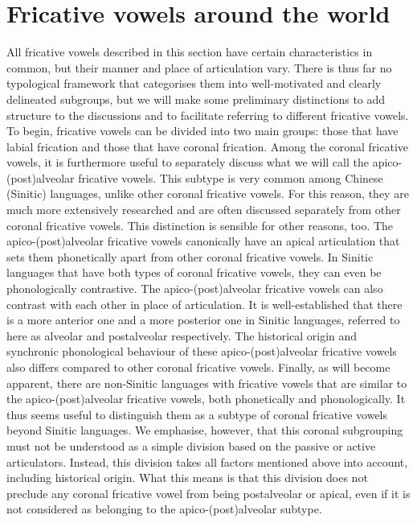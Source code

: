 \documentclass[output=paper,colorlinks,citecolor=brown,chinesefont]{langscibook}
\begin{document}
\section{Fricative vowels around the world} \label{section2}
All fricative vowels described in this section have certain characteristics in common, but their manner and place of articulation vary. There is thus far no typological framework that categorises them into well-motivated and clearly delineated subgroups, but we will make some preliminary distinctions to add structure to the discussions and to facilitate referring to different fricative vowels. To begin, fricative vowels can be divided into two main groups: those that have labial frication and those that have coronal frication. Among the coronal fricative vowels, it is furthermore useful to separately discuss what we will call the apico-(post)alveolar fricative vowels. This subtype is very common among Chinese (Sinitic) languages, unlike other coronal fricative vowels. For this reason, they are much more extensively researched and are often discussed separately from other coronal fricative vowels. This distinction is sensible for other reasons, too. The apico-(post)alveolar fricative vowels canonically have an apical articulation that sets them phonetically apart from other coronal fricative vowels. In Sinitic languages that have both types of coronal fricative vowels, they can even be phonologically contrastive. The apico-(post)alveolar fricative vowels can also contrast with each other in place of articulation. It is well-established that there is a more anterior one and a more posterior one in Sinitic languages, referred to here as alveolar and postalveolar respectively. The historical origin and synchronic phonological behaviour of these apico-(post)alveolar fricative vowels also differs compared to other coronal fricative vowels. Finally, as will become apparent, there are non-Sinitic languages with fricative vowels that are similar to the apico-(post)alveolar fricative vowels, both phonetically and phonologically. It thus seems useful to distinguish them as a subtype of coronal fricative vowels beyond Sinitic languages. We emphasise, however, that this coronal subgrouping must not be understood as a simple division based on the passive or active articulators. Instead, this division takes all factors mentioned above into account, including historical origin. What this means is that this division does not preclude any coronal fricative vowel from being postalveolar or apical, even if it is not considered as belonging to the apico-(post)alveolar subtype.
\end{document}
